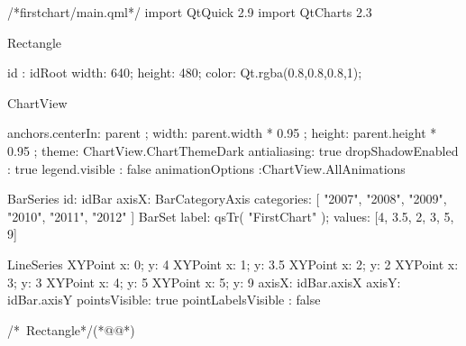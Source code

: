 \label{f000080}    %
\FloatBarrier                                  %
\begin{thebookfilesourceone}[escapeinside={(*@}{@*)},
caption=GoodLuck,
title=\filesourcenumbernameone \thefilesourcenumber
]
/*firstchart/main.qml*/
import QtQuick 2.9
import QtCharts 2.3

Rectangle {

    id : idRoot
    width: 640;
    height: 480;
    color: Qt.rgba(0.8,0.8,0.8,1);

    ChartView{
        anchors.centerIn: parent ;
        width: parent.width * 0.95 ;
        height: parent.height * 0.95 ;
        theme: ChartView.ChartThemeDark
        antialiasing: true
        dropShadowEnabled : true
        legend.visible : false
        animationOptions :ChartView.AllAnimations

        BarSeries {
            id: idBar
            axisX: BarCategoryAxis {
                categories: [
                    "2007",
                    "2008",
                    "2009",
                    "2010",
                    "2011",
                    "2012" ] }
            BarSet {
                label: qsTr( "FirstChart" );
                values: [4, 3.5, 2, 3, 5, 9]
            }
        }

        LineSeries{
            XYPoint { x: 0; y: 4 }
            XYPoint { x: 1; y: 3.5 }
            XYPoint { x: 2; y: 2 }
            XYPoint { x: 3; y: 3 }
            XYPoint { x: 4; y: 5 }
            XYPoint { x: 5; y: 9 }
            axisX: idBar.axisX
            axisY: idBar.axisY
            pointsVisible: true
            pointLabelsVisible : false
        }

    }

}/*~Rectangle*/(*@\marginpar[\hfill\setlength\fboxsep{2pt}\fbox{\footnotesize{\kaishu\parbox{1em}{\setlength{\baselineskip}{2pt}\filesourcenumbernameone}}\footnotesize{\thefilesourcenumber}}]{\setlength\fboxsep{2pt}\fbox{\footnotesize{\kaishu\parbox{1em}{\setlength{\baselineskip}{2pt}\filesourcenumbernameone}}\footnotesize{\thefilesourcenumber}}}@*)\end{thebookfilesourceone}          %
\addtocounter{lstlisting}{-1}   %

